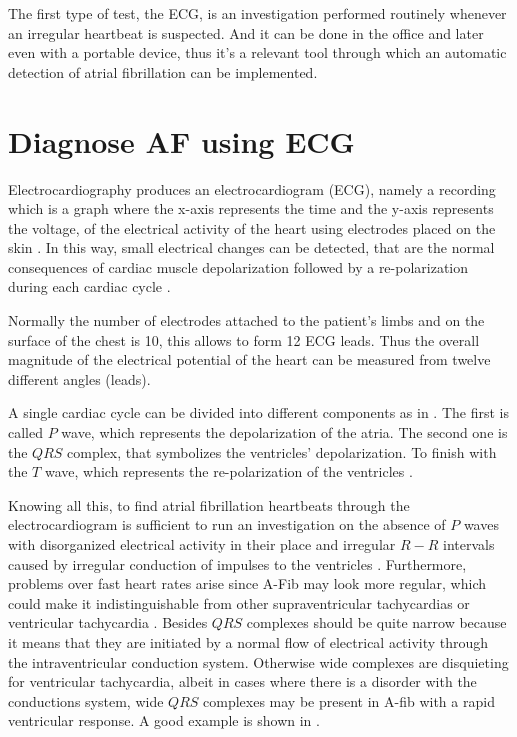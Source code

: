 The first type of test, the ECG, is an investigation performed routinely whenever an irregular heartbeat is suspected. And it can be done in the office and later even with a portable device, thus it's a relevant tool through which an automatic detection of atrial fibrillation can be implemented.

\section{Diagnose AF using ECG}
\label{sec:ecg_diagnose}
Electrocardiography produces an electrocardiogram (ECG), namely a recording which is a graph where the x-axis represents the time and the y-axis represents the voltage, of the electrical activity of the heart using electrodes placed on the skin \cite[p.74]{lilly2015pathophysiology}. In this way, small electrical changes can be detected, that are the normal consequences of cardiac muscle depolarization followed by a re-polarization during each cardiac cycle .


Normally the number of electrodes attached to the patient's limbs and on the surface of the chest is 10, this allows to form 12 ECG leads. Thus the overall magnitude of the electrical potential of the heart can be measured from twelve different angles (leads). 

A single cardiac cycle can be divided into different components as in . The first is called $P$ wave, which represents the depolarization of the atria. The second one is the $QRS$ complex, that symbolizes the ventricles' depolarization. To finish with the $T$ wave, which represents the re-polarization of the ventricles \cite[p.80]{lilly2015pathophysiology}.


Knowing all this, to find atrial fibrillation heartbeats through the electrocardiogram is sufficient to run an investigation on the absence of $P$ waves with disorganized electrical activity in their place and irregular $R-R$ intervals caused by irregular conduction of impulses to the ventricles \cite{doi:10.1161/CIRCULATIONAHA.106.177292}. Furthermore, problems over fast heart rates arise since A-Fib may look more regular, which could make it indistinguishable from other supraventricular tachycardias or ventricular tachycardia \cite{issa2009clinical}.
Besides $QRS$ complexes should be quite narrow because it means that they are initiated by a normal flow of electrical activity through the intraventricular conduction system. Otherwise wide complexes are disquieting for ventricular tachycardia, albeit in cases where there is a disorder with the conductions system, wide $QRS$ complexes may be present in A-fib with a rapid ventricular response. A good example is shown in .

